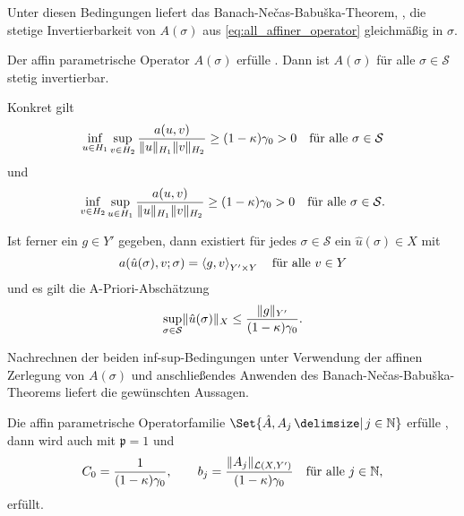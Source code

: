 Unter diesen Bedingungen liefert das Banach-Ne{\v c}as-Babu{\v s}ka-Theorem, , die stetige Invertierbarkeit von $A(\sigma)$ aus \eqref{eq:all_affiner_operator} gleichmäßig in $\sigma$.

\begin{Satz}
    Der affin parametrische Operator $A(\sigma)$ erfülle .
    Dann ist $A(\sigma)$ für alle $\sigma \in \mathcal S$ stetig invertierbar.

    Konkret gilt
    \begin{equation}
        \inf_{u \in H_{1}} \sup_{v \in H_{2}} \frac{a(u, v)}{\norm{u}_{H_{1}} \norm{v}_{H_{2}}} \geq (1 - \kappa) \gamma_{0} > 0 \quad \fa \sigma \in \mathcal S
    \end{equation}
    und
    \begin{equation}
        \inf_{v \in H_{2}} \sup_{u \in H_{1}} \frac{a(u, v)}{\norm{u}_{H_{1}} \norm{v}_{H_{2}}} \geq (1 - \kappa) \gamma_{0} > 0 \quad \fa \sigma \in \mathcal S.
    \end{equation}

    Ist ferner ein $g \in Y'$ gegeben, dann existiert für jedes $\sigma \in \mathcal S$ ein $\hat u(\sigma) \in X$ mit
    \begin{equation}
        a(\hat u(\sigma), v; \sigma) = \skprod{g}{v}_{Y' \times Y} \quad \fa v \in Y
    \end{equation}
    und es gilt die A-Priori-Abschätzung
    \begin{equation}
        \sup_{\sigma \in \mathcal S} \norm{\hat u(\sigma)}_{X} \leq \frac{\norm{g}_{Y'}}{(1 - \kappa) \gamma_{0}}.
    \end{equation}

    \begin{Beweis}
        Nachrechnen der beiden inf-sup-Bedingungen unter Verwendung der affinen Zerlegung von $A(\sigma)$ und anschließendes Anwenden des Banach-Ne{\v c}as-Babu{\v s}ka-Theorems liefert die gewünschten Aussagen.
    \end{Beweis}
\end{Satz}

\begin{Korollar}
\label{thm:kunoth:corollary3}
    Die affin parametrische Operatorfamilie $\Set{\hat A, A_{j} \given j \in \mathbb{N}}$ erfülle , dann wird auch  mit $\mathfrak p = 1$ und
    \begin{equation}
        C_{0} = \frac{1}{(1 - \kappa) \gamma_{0}}, \qquad b_{j} = \frac{\norm{A_{j}}_{\mathcal L(X, Y')}}{(1 - \kappa) \gamma_{0}} \quad \fa j \in \mathbb{N},
    \end{equation}
    erfüllt.
\end{Korollar}

